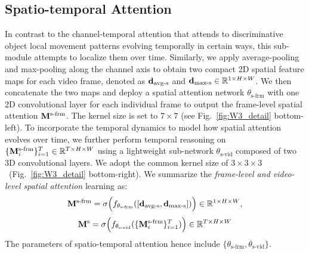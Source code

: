 \documentclass[runningheads]{llncs}
\begin{document}
\subsection{Spatio-temporal Attention}
\label{sec:spatial_att}
In contrast to the channel-temporal attention that attends to discriminative object local movement patterns evolving temporally in certain ways,  this sub-module attempts to localize them over time.
Similarly, we apply average-pooling and max-pooling along the channel axis to obtain two compact 2D spatial feature maps
for each video frame, denoted as ${\bf d}_{\text{avg-s}}$
and ${\bf d}_{\text{max-s}} \in \mathbb{R}^{1\times H\times W}$.
We then concatenate the two maps and deploy a spatial attention network $\theta_{\text{s-frm}}$ with one 2D convolutional layer 
for each individual frame to output the frame-level spatial attention ${\bf M}^{\text{s-frm}}$.
The kernel size is set to $7\times 7$  (see Fig.~\ref{fig:W3_detail} bottom-left).
To incorporate the temporal dynamics to model how spatial attention evolves over time,
we further perform temporal reasoning on $\{ {\bf M}_i^{\text{s-frm}}\}_{i=1}^T \in \mathbb{R}^{T \times H \times W}$ using a lightweight sub-network $\theta_{\text{s-vid}}$ composed of two 3D convolutional layers.
We adopt the common kernel size of $3\times 3\times 3$~(Fig.~\ref{fig:W3_detail} bottom-right).
We summarize the {\em frame-level and video-level spatial attention} learning as:
\begin{equation}
     {\bf M}^{\text{s-frm}} = 
    \sigma\Big(f_{\theta_{\text{s-frm}}}([{\bf d}_{\text{avg-s}},{\bf d}_{\text{max-s}}])\Big)
    \in \mathbb{R}^{1\times H \times W},
\end{equation}
\begin{equation}
    {\bf M}^{\text{s}} = 
    \sigma\Big(f_{\theta_{\text{s-vid}}}(\{{\bf M}^{\text{s-frm}}_i\}_{i=1}^T)\Big) \in \mathbb{R}^{T \times H \times W}
\end{equation}
The parameters of spatio-temporal attention hence include $\{\theta_{\text{s-frm}}, \theta_{\text{s-vid}}\}$.
\end{document}
